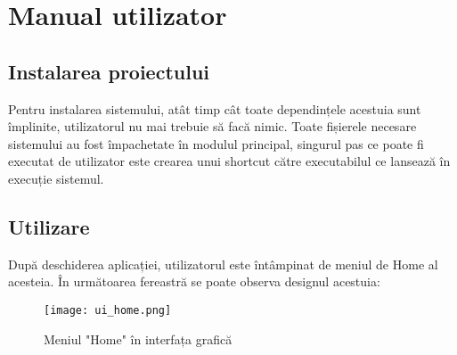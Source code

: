 
 \chapter{Manual utilizator}

\label{cap:user-manual}
%
%
%

\section{Instalarea proiectului}

Pentru instalarea sistemului, atât timp cât toate dependințele acestuia sunt împlinite, utilizatorul nu mai trebuie să facă nimic. Toate fișierele necesare sistemului au fost împachetate în modulul principal, singurul pas ce poate fi executat de utilizator este crearea unui shortcut către executabilul ce lansează în execuție sistemul. 
\section{Utilizare}

După deschiderea aplicației, utilizatorul este întâmpinat de meniul de Home al acesteia. În următoarea fereastră se poate observa designul acestuia:  

\begin{figure}[h]
	\centering
	\texttt{[image: ui\_home.png]}
	\caption{ Meniul "Home" în interfața grafică }
	\label{fig:ui_home}
\end{figure}

